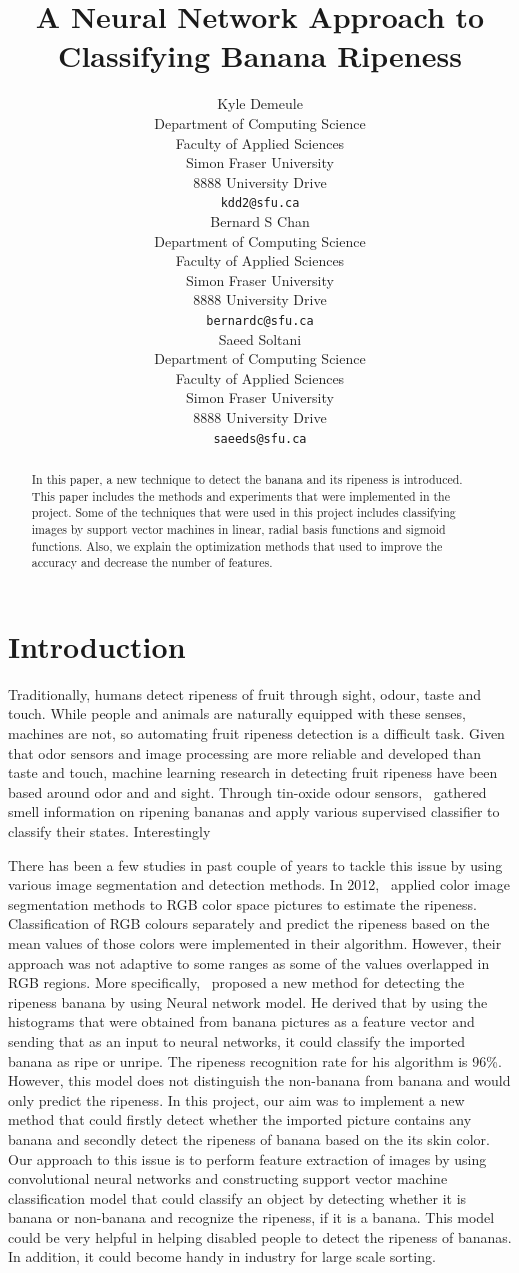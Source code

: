 \documentclass{article} %
\title{A Neural Network Approach to Classifying Banana Ripeness}
\author{
Kyle Demeule\\
Department of Computing Science\\
Faculty of Applied Sciences\\
Simon Fraser University\\
8888 University Drive\\
\texttt{kdd2@sfu.ca} \\
\And
Bernard S Chan \\
Department of Computing Science\\
Faculty of Applied Sciences\\
Simon Fraser University\\
8888 University Drive\\
\texttt{bernardc@sfu.ca} \\
\AND
Saeed Soltani\\
Department of Computing Science\\Faculty of Applied Sciences\\
Simon Fraser University\\
8888 University Drive\\
\texttt{saeeds@sfu.ca} \\
}
\begin{document}
\maketitle

\begin{abstract}
In this paper, a new technique to detect the banana and its ripeness is introduced. This paper includes the methods and experiments that were implemented in the project. Some of the techniques that were used in this project includes classifying images by support vector machines in linear, radial basis functions and sigmoid functions. Also, we explain the optimization methods that used to improve the accuracy and decrease the number of features.\end{abstract}

\section{Introduction}

Traditionally, humans detect ripeness of fruit  through sight, odour, taste and touch. While people and animals are naturally equipped with these senses, machines are not, so automating fruit ripeness detection is a difficult task. Given that odor sensors and image processing are more reliable and developed than taste and touch, machine learning research in detecting fruit ripeness have been based around odor and and sight.  Through tin-oxide odour sensors,~\citet{llobet1999non} gathered smell information on ripening bananas and apply various supervised classifier to classify their states. Interestingly


There has been a few studies in past couple of years to tackle this issue by using various image segmentation and detection methods. In 2012,~\citet{dadwal2012color} applied color image segmentation methods to RGB color space pictures to estimate the ripeness. Classification of RGB colours separately and predict the ripeness based on the mean values of those colors were implemented in their algorithm. However, their approach was not adaptive to some ranges as some of the values overlapped in RGB regions. More specifically,~\citet{paulraj2009color} proposed a new method for detecting the ripeness banana by using Neural network model. He derived that by using the histograms that were obtained from banana pictures as a feature vector and sending that as an input to neural networks, it could classify the imported banana as ripe or unripe. The ripeness recognition rate for his algorithm is 96\%. However, this model does not distinguish the non-banana from banana and would only predict the ripeness. In this project, our aim was to implement a new method that could firstly detect whether the imported picture contains any banana and secondly detect the ripeness of banana based on the its skin color. Our approach to this issue is to perform feature extraction of images by using convolutional neural networks and constructing support vector machine classification model that could classify an object by detecting whether it is banana or non-banana and recognize the ripeness, if it is a banana. This model could be very helpful in helping disabled people to detect the ripeness of bananas. In addition, it could become handy in industry for large scale sorting. 
\end{document}

